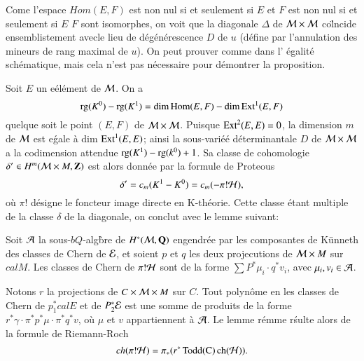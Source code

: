 Come l'espace $Hom(E, F)$ est non nul si et seulement si $E$ et $F$ est non nul si et seulement si $E$ $F$ sont isomorphes, on voit que la diagonale $\Delta$ de $\mathcal{M} \times \mathcal{M}$ co\"lncide ensemblistement avecle lieu de d\'eg\'en\'erescence $D$ de $u$ (d\'efine par l'annulation des mineurs de rang maximal de $u$). On peut prouver comme dans \cite{chap3-keyE-S} l' \'egalit\'e sch\'ematique, mais cela n'est pas n\'ecessaire pour d\'emontrer la proposition. 

Soit $E$ un e\'el\'ement de $\mathcal{M}$. On a
$$
\operatorname{rg}(K^{0})-\operatorname{rg}(K^{1}) = \dim \operatorname{Hom}(E,F)-\dim \operatorname{Ext}^{1}(E, F)
$$
quel\pageoriginale que soit le point $(E, F)$ de $\mathcal{M} \times \mathcal{M}$. Puisque $\operatorname{Ext}^{2}(E, E) = 0$, la dimension $m$ de $\mathcal{M}$ est e\'gale \`a dim $\operatorname{Ext}^{1}(E, E)$; ainsi la sous-vari\'e\'e d\'eterminantale $D$ de $\mathcal{M} \times \mathcal{M}$ a la codimension attendue $\operatorname{rg}(K^{1}) - \operatorname{rg}(k^{0}) + 1$. Sa classe de cohomologie $\delta' \in H^{m}(\mathcal{M} \times M, \mathbf{Z})$ est alors donn\'ee par la formule de Proteous  
$$
\delta' = c_{m}(K^{1}-K^{0}) = c_{m}(-\pi!\mathcal{H}),
$$
o\`u $\pi!$ d\'esigne le foncteur image directe en K-th\'eorie. Cette classe \'etant multiple de la classe $\delta$ de la diagonale, on conclut avec le lemme suivant:

\begin{lemme*}
Soit $\mathcal{A}$ la sous-$bQ$-alg\`bre de  $H^{*}(\mathcal{M}, \mathbf{Q})$ engendr\'ee par les composantes de K\"unneth des classes de Chern de $\mathcal{E}$, et soient $p$ et $q$ les deux projecutions de $\mathcal{M} \times M$ sur $calM$. Les classes de Chern de $\pi!\mathcal{H}$ sont de la forme $\sum P^{*}\mu_{i} \cdot q^{*}v_{i}$, avec $\mu_{i}, v_{i}\in \mathcal{A}$. 
\end{lemme*}

Notons $r$ la projections de $C\times \mathcal{M} \times M$ sur $C$. Tout polyn\^ome
en les classes de Chern de $p_{1}^{*}calE$ et de $P_{2}^{*}\mathcal{E}$ est une somme de produits de la forme $r^{*}\gamma\cdot \pi^{*}p^{*}\mu \cdot \pi^{*}q^{*}v$,  o\`u $\mu$ et $v$ appartiennent \`a $\mathcal{A}$. Le lemme r\'emme r\'sulte alors de la formule de Riemann-Roch
$$
ch(\pi!\mathcal{H}) =\pi_{*}(r^{*}\operatorname{Todd}(\operatorname{C}) \operatorname{ch}(\mathcal{H})). 
$$

